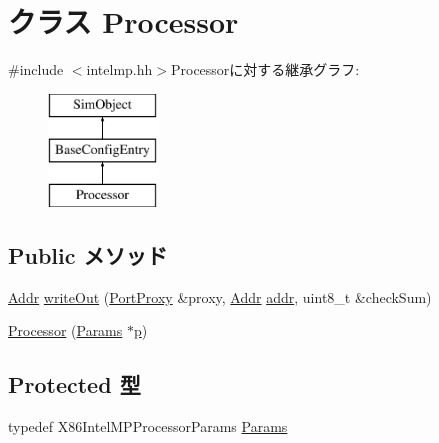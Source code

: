\hypertarget{classX86ISA_1_1IntelMP_1_1Processor}{
\section{クラス Processor}
\label{classX86ISA_1_1IntelMP_1_1Processor}
}


{\ttfamily \#include $<$intelmp.hh$>$}Processorに対する継承グラフ:\begin{figure}[H]
\begin{center}
\leavevmode
\includegraphics[height=3cm]{classX86ISA_1_1IntelMP_1_1Processor}
\end{center}
\end{figure}
\subsection*{Public メソッド}
\begin{DoxyCompactItemize}
\item 
\hyperlink{base_2types_8hh_af1bb03d6a4ee096394a6749f0a169232}{Addr} \hyperlink{classX86ISA_1_1IntelMP_1_1Processor_a5fffc1006b1f28bd779d83ffbe213b4f}{writeOut} (\hyperlink{classPortProxy}{PortProxy} \&proxy, \hyperlink{base_2types_8hh_af1bb03d6a4ee096394a6749f0a169232}{Addr} \hyperlink{namespaceX86ISA_ab705917f60c5566f9ce56a93f798b2e2}{addr}, uint8\_\-t \&checkSum)
\item 
\hyperlink{classX86ISA_1_1IntelMP_1_1Processor_a3eb127f7e6b23013a2f43dab6bffd8d3}{Processor} (\hyperlink{classX86ISA_1_1IntelMP_1_1Processor_a7e3febf745d41a8475b39c400cec69a8}{Params} $\ast$\hyperlink{namespaceX86ISA_af675c1d542a25b96e11164b80809a856}{p})
\end{DoxyCompactItemize}
\subsection*{Protected 型}
\begin{DoxyCompactItemize}
\item 
typedef X86IntelMPProcessorParams \hyperlink{classX86ISA_1_1IntelMP_1_1Processor_a7e3febf745d41a8475b39c400cec69a8}{Params}
\end{DoxyCompactItemize}
